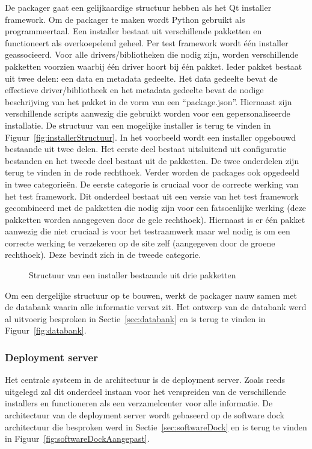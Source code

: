 De packager gaat een gelijkaardige structuur hebben als het Qt installer framework.
Om de packager te maken wordt Python gebruikt als programmeertaal.
Een installer bestaat uit verschillende pakketten en functioneert als overkoepelend geheel.
Per test framework wordt één installer geassocieerd.
Voor alle drivers/bibliotheken die nodig zijn, worden verschillende pakketten voorzien waarbij één driver hoort bij één pakket.
Ieder pakket bestaat uit twee delen: een data en metadata gedeelte.
Het data gedeelte bevat de effectieve driver/bibliotheek en het metadata gedeelte bevat de nodige beschrijving van het pakket in de vorm van een ``package.json''.
Hiernaast zijn verschillende scripts aanwezig die gebruikt worden voor een gepersonaliseerde installatie.
De structuur van een mogelijke installer is terug te vinden in Figuur~\vref{fig:installerStructuur}.
In het voorbeeld wordt een installer opgebouwd bestaande uit twee delen.
Het eerste deel bestaat uitsluitend uit configuratie bestanden en het tweede deel bestaat uit de pakketten.
De twee onderdelen zijn terug te vinden in de rode rechthoek.
Verder worden de packages ook opgedeeld in twee categorieën.
De eerste categorie is cruciaal voor de correcte werking van het test framework.
Dit onderdeel bestaat uit een versie van het test framework gecombineerd met de pakketten die nodig zijn voor een fatsoenlijke werking (deze pakketten worden aangegeven door de gele rechthoek).
Hiernaast is er één pakket aanwezig die niet cruciaal is voor het testraamwerk maar wel nodig is om een correcte werking te verzekeren op de site zelf (aangegeven door de groene rechthoek).
Deze bevindt zich in de tweede categorie.

\begin{figure}[!ht]
\centering
{}
\caption{Structuur van een installer bestaande uit drie pakketten}
\label{fig:installerStructuur}
\end{figure}

Om een dergelijke structuur op te bouwen, werkt de packager nauw samen met de databank waarin alle informatie vervat zit.
Het ontwerp van de databank werd al uitvoerig besproken in Sectie~\vref{sec:databank} en is terug te vinden in Figuur~\vref{fig:databank}.

\subsubsection{Deployment server}
Het centrale systeem in de architectuur is de deployment server.
Zoals reeds uitgelegd zal dit onderdeel instaan voor het verspreiden van de verschillende installers en functioneren als een verzamelcenter voor alle informatie.
De architectuur van de deployment server wordt gebaseerd op de software dock architectuur die besproken werd in Sectie~\vref{sec:softwareDock} en is terug te vinden in Figuur~\vref{fig:softwareDockAangepast}.

